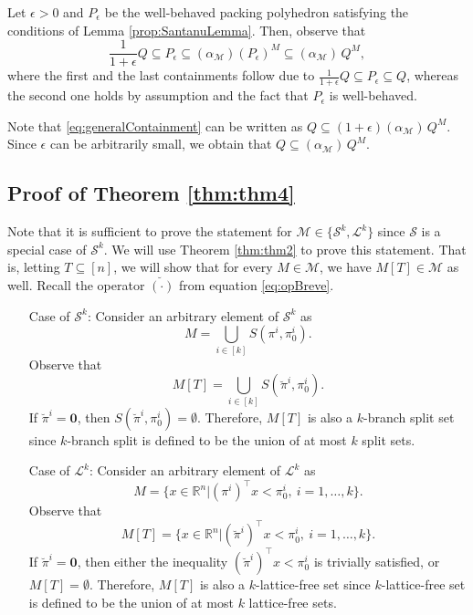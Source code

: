 \documentclass[11pt]{article}
\newcommand{\R}{\mathbb{R}}
\newcommand{\seq}{\subseteq}
\renewcommand{\S}{\mathcal{S}}
\renewcommand{\L}{\mathcal{L}}
\newcommand{\Mset}{M}
\newcommand{\M}{\mathcal{\Mset}}
\newcommand{\Tset}{T}
\newcommand{\zeros}{\boldsymbol{0}}
\newcommand{\cred}{\color{black}}
\begin{document}
Let $\epsilon > 0$ and $P_\epsilon$ be the well-behaved packing polyhedron satisfying the conditions of Lemma \ref{prop:SantanuLemma}. Then, observe that 
\begin{equation}
\label{eq:generalContainment}
\frac{1}{1+\epsilon} Q \subseteq P_\epsilon \subseteq (\alpha_\M) (P_\epsilon)^\Mset \subseteq (\alpha_\M) \,  Q^\Mset,
\end{equation}
where the first and the last containments follow due to $\frac{1}{1+\epsilon} Q \subseteq P_\epsilon \subseteq Q$, whereas the second one holds by assumption and the fact that $P_\epsilon$ is well-behaved. 

Note that \eqref{eq:generalContainment} can be written as $Q \subseteq (1+\epsilon) (\alpha_\M) \,  Q^\Mset$. Since $\epsilon$ can be arbitrarily small, we obtain that $Q \subseteq (\alpha_\M) \,  Q^\Mset$.
\subsection{Proof of Theorem \ref{thm:thm4}}
\label{subsec:4.4}
Note that it is sufficient to prove the statement for $\M \in \{ \S^k, \L^k \}$ since $\S$ is a special case of $\S^k$. We will use Theorem \ref{thm:thm2} to prove this statement. That is, letting $T \seq [n]$, we will show that for every $\Mset \in \M$, we have $\Mset[\Tset] \in \M$ as well. {\cred Recall the operator $\breve{(\cdot)}$ from equation \eqref{eq:opBreve}.}


\begin{itemize}
\item[Case of $\S^k$:]  Consider an arbitrary element of $\S^k$ as
$$M = \bigcup_{i \in [k]} S(\pi^i,\pi^i_0).$$
Observe that 
$$M[\Tset] = \bigcup_{i \in [k]} S(\breve \pi^i,\pi^i_0).$$
If $\breve \pi^i = \zeros$, then $S(\breve \pi^i,\pi^i_0) = \emptyset$. Therefore, $M[T]$ is also a $k$-branch split set since $k$-branch split is defined to be the union of at most $k$ split sets.

\item[Case of $\L^k$:]  Consider an arbitrary element of $\L^k$ as
$$M = \{ x \in \R^n | (\pi^i)^\top x < \pi^i_0, \ i = 1,\hdots,k \} .$$
Observe that 
$$M[\Tset] = \{ x \in \R^n | (\breve \pi^i)^\top x < \pi^i_0, \ i = 1,\hdots,k \} .$$
If $\breve \pi^i = \zeros$, then either the inequality $(\breve \pi^i)^\top x < \pi^i_0$ is trivially satisfied, or $M[\Tset] = \emptyset$. Therefore, $M[T]$ is also a $k$-lattice-free set since $k$-lattice-free set is defined to be the union of at most $k$ lattice-free sets.

\end{itemize}
\end{document}
